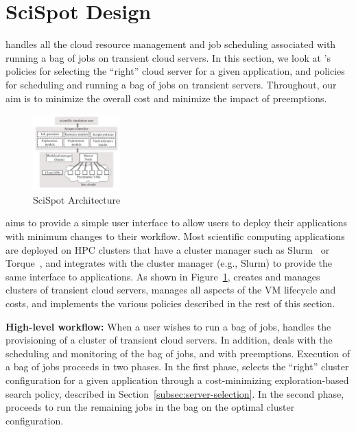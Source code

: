 \section{SciSpot Design}
\label{sec:design}

\sysname handles all the cloud resource management and job scheduling associated with running a bag of jobs on transient cloud servers. 
In this section, we look at \sysname's policies for selecting the ``right'' cloud server for a given application, and policies for scheduling and running a bag of jobs on transient servers.
Throughout, our aim is to minimize the overall cost and minimize the impact of preemptions.  


\begin{figure}[h]
  \includegraphics[width=0.3\textwidth]{../figures/Architecture.png}
  \caption{SciSpot Architecture}
  \label{fig:arch}
\end{figure}

\sysname aims to provide a simple user interface to allow users to deploy their applications with minimum changes to their workflow.
Most scientific computing applications are deployed on HPC clusters that have a cluster manager such as Slurm~\cite{slurm} or Torque~\cite{torque}, and \sysname integrates with the cluster manager (e.g., Slurm) to provide the same interface to applications.
As shown in Figure~\ref{fig:arch}, \sysname creates and manages clusters of transient cloud servers, manages all aspects of the VM lifecycle and costs, and implements the various policies described in the rest of this section. 


\noindent \textbf{High-level workflow:} When a user wishes to run a bag of jobs, \sysname handles the provisioning of a cluster of transient cloud servers. In addition, \sysname deals with the scheduling and monitoring of the bag of jobs, and with preemptions.
Execution of a bag of jobs proceeds in two phases. In the first phase, \sysname selects the ``right'' cluster configuration for a given application through a cost-minimizing exploration-based search policy, described in Section~\ref{subsec:server-selection}.
In the second phase, \sysname proceeds to run the remaining jobs in the bag on the optimal cluster configuration. 

